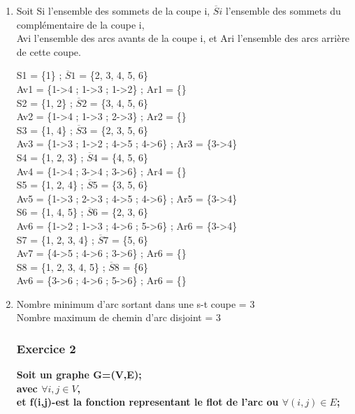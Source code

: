 \documentclass{article}
\begin{document}
\begin{enumerate}
\item Soit Si l'ensemble des sommets de la coupe i, $\overline Si$ l'ensemble des sommets du complémentaire de la coupe i, \\
Avi l'ensemble des arcs avants de la coupe i, et Ari l'ensemble des arcs arrière de cette coupe.\\
\begin{center}
S1 = \{1\} ; $\overline S1$ = \{2, 3, 4, 5, 6\}\\ 
Av1 = \{1->4 ; 1->3 ; 1->2\} ; Ar1 = \{\}\\
S2 = \{1, 2\} ; $\overline S2$ = \{3, 4, 5, 6\}\\
Av2 = \{1->4 ; 1->3 ; 2->3\} ; Ar2 = \{\}\\ 
S3 = \{1, 4\} ; $\overline S3$ = \{2, 3, 5, 6\}\\
Av3 = \{1->3 ; 1->2 ; 4->5 ; 4->6\} ; Ar3 = \{3->4\}\\
S4 = \{1, 2, 3\} ; $\overline S4$ = \{4, 5, 6\}\\ 
Av4 = \{1->4 ; 3->4 ; 3->6\} ; Ar4 = \{\}\\
S5 = \{1, 2, 4\} ; $\overline S5$ = \{3, 5, 6\}\\
Av5 = \{1->3 ; 2->3 ; 4->5 ; 4->6\} ; Ar5 = \{3->4\}\\
S6 = \{1, 4, 5\} ; $\overline S6$ = \{2, 3, 6\}\\
Av6 = \{1->2 ; 1->3 ; 4->6 ; 5->6\} ; Ar6 = \{3->4\}\\ 
S7 = \{1, 2, 3, 4\} ; $\overline S7$ = \{5, 6\}\\ 
Av7 = \{4->5 ; 4->6 ; 3->6\} ; Ar6 = \{\}\\ 
S8 = \{1, 2, 3, 4, 5\} ; $\overline S8$ = \{6\}\\
Av6 = \{3->6 ; 4->6 ; 5->6\} ; Ar6 = \{\}\\
\end{center}


\item Nombre minimum d'arc sortant dans une s-t coupe = 3\\
  Nombre maximum de chemin d'arc disjoint = 3\\


\subsubsection{Exercice 2}

\textbf{Soit un graphe G=(V,E);\\
avec $\forall i,j \in V$,\\
et f(i,j)-est la fonction representant le flot de l'arc ou $\forall (i,j)\in E$;\\}


\end{enumerate}
\end{document}
